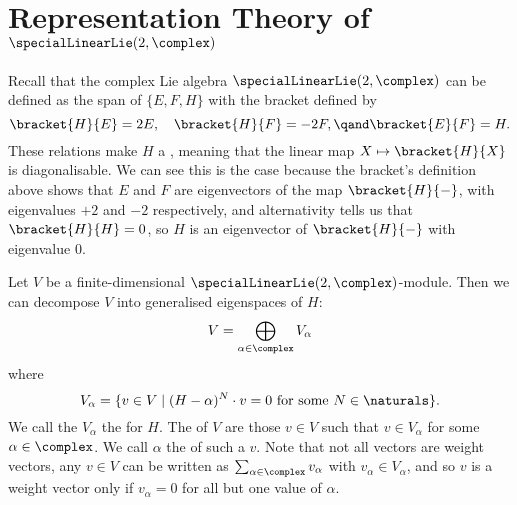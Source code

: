 \documentclass[fleqn]{NotesClass}
\begin{document}
    \section{Representation Theory of \texorpdfstring{\(\specialLinearLie(2, \complex)\)}{sl(2, C)}}
    Recall that the complex Lie algebra \(\specialLinearLie(2, \complex)\) can be defined as the span of \(\{E, F, H\}\) with the bracket defined by
    \begin{equation}
        \bracket{H}{E} = 2E, \quad \bracket{H}{F} = -2F, \qand \bracket{E}{F} = H.
    \end{equation}
    These relations make \(H\) a , meaning that the linear map \(X \mapsto \bracket{H}{X}\) is diagonalisable.
    We can see this is the case because the bracket's definition above shows that \(E\) and \(F\) are eigenvectors of the map \(\bracket{H}{-}\), with eigenvalues \(+2\) and \(-2\) respectively, and alternativity tells us that \(\bracket{H}{H} = 0\), so \(H\) is an eigenvector of \(\bracket{H}{-}\) with eigenvalue \(0\).
    
    Let \(V\) be a finite-dimensional \(\specialLinearLie(2, \complex)\)-module.
    Then we can decompose \(V\) into generalised eigenspaces of \(H\):
    \begin{equation}
        V = \bigoplus_{\alpha \in \complex} V_\alpha
    \end{equation}
    where
    \begin{equation}
        V_\alpha = \{v \in V \mid (H - \alpha)^N \cdot v = 0 \text{ for some } N \in \naturals\}.
    \end{equation}
    We call the \(V_\alpha\) the  for \(H\).
    The  of \(V\) are those \(v \in V\) such that \(v \in V_\alpha\) for some \(\alpha \in \complex\).
    We call \(\alpha\) the  of such a \(v\).
    Note that not all vectors are weight vectors, any \(v \in V\) can be written as \(\sum_{\alpha \in \complex} v_\alpha\) with \(v_\alpha \in V_\alpha\), and so \(v\) is a weight vector only if \(v_\alpha = 0\) for all but one value of \(\alpha\).
    
\end{document}
